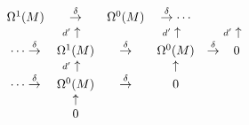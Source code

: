 \begin{equation}
\begin{array}{ccccccc}
\Omega^{1}(M) &  \stackrel{\delta}{\to} & \Omega^{0}(M) &


\stackrel{\delta}{\to} \cdots\\


%


& \llap{$\scriptstyle d'$}\uparrow & & \llap{$\scriptstyle d'$}\uparrow &


& \llap{$\scriptstyle d'$}\uparrow \\


%


\cdots\stackrel{\delta}{\to} & \Omega^{1}(M) &  \stackrel{\delta}{\to} &


\Omega^{0}(M) &  \stackrel{\delta}{\to} & 0 \\


%


& \llap{$\scriptstyle d'$}\uparrow & & \uparrow \\


%


\cdots\stackrel{\delta}{\to} & \Omega^{0}(M) &  \stackrel{\delta}{\to} & 0 \\


%


 & \uparrow \\


%


 & 0 \\


\end{array}


\end{equation}








